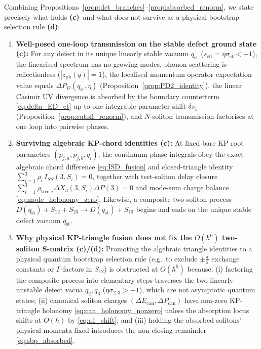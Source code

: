 \documentclass[11pt,a4paper]{article}
\newcommand{\Lc}{\textsf{\textbf{(c)}}}
\newcommand{\Ld}{\textsf{\textbf{(d)}}}
\newcommand{\hb}{\hbar}
\theoremstyle{remark}
\begin{document}
Combining Propositions~\ref{prop:det_branches}--\ref{prop:absorbed_renorm}, we
state precisely what holds \Lc\ and what does not survive as a physical
bootstrap selection rule \Ld:
\begin{enumerate}
\item \textbf{Well-posed one-loop transmission on the stable defect ground state \Lc:}
For any defect in its unique linearly stable vacuum $q_{\mathrm{st}}$
($s_{\mathrm{eff}} = \eta\sigma_{\mathrm{st}} < -1$), the linearised spectrum has
no growing modes, phonon scattering is reflectionless ($|z_{\mathrm{ph}}(q)|=1$),
the localised momentum operator expectation value equals $\Delta P_D(q_{\mathrm{st}},\eta)$
(Proposition~\ref{prop:PD2_identity}), the linear Casimir UV divergence is
absorbed by the boundary counterterm \eqref{eq:delta_ED_ct} up to one integrable
parameter shift $\delta s_1$ (Proposition~\ref{prop:cutoff_renorm}), and
$N$-soliton transmission factorises at one loop into pairwise phases.
\item \textbf{Surviving algebraic KP-chord identities \Lc:}
At fixed bare KP root parameters $(p_{j,a},p_{j,b},q_i)$, the continuum phase
integrals obey the exact algebraic chord difference \eqref{eq:ISD_fusion} and
closed-triangle identity $\sum_{i=1}^3\rho_i\,I_{SS}(3,S_i)=0$, together with
test-soliton delay closure $\sum_{i=1}^3\rho_{\mathrm{tree},i}\Delta X_3(3,S_i)\Delta P(3)=0$
and mode-sum charge balance \eqref{eq:mode_holonomy_zero}. Likewise, a composite
two-soliton process $D(q_{\mathrm{st}}) + S_{12} + S_{23} \to D(q_{\mathrm{st}}) + S_{13}$
begins and ends on the unique stable defect vacuum $q_{\mathrm{st}}$.
\item \textbf{Why physical KP-triangle fusion does not fix the $O(\hb^0)$ two-soliton S-matrix \Lc/\Ld:}
Promoting the algebraic triangle identities to a physical quantum bootstrap
selection rule (e.g.\ to exclude $\pm\frac{\pi}{2}$ exchange constants or
$\Gamma$-factors in $S_{12}$) is obstructed at $O(\hb^0)$ because:
(i) factoring the composite process into elementary steps traverses the two
linearly unstable defect vacua $q_2,q_3$ ($\eta\sigma_{2,3}>-1$), which are not
asymptotic quantum states;
(ii) canonical soliton charges $(\Delta E_{\mathrm{can}},\Delta P_{\mathrm{can}})$
have non-zero KP-triangle holonomy \eqref{eq:can_holonomy_nonzero} unless the
absorption locus shifts at $O(\hb)$ by \eqref{eq:a1_shift}; and
(iii) holding the absorbed solitons' physical momenta fixed introduces the
non-closing remainder \eqref{eq:sbp_absorbed}.
\end{enumerate}
\end{document}
